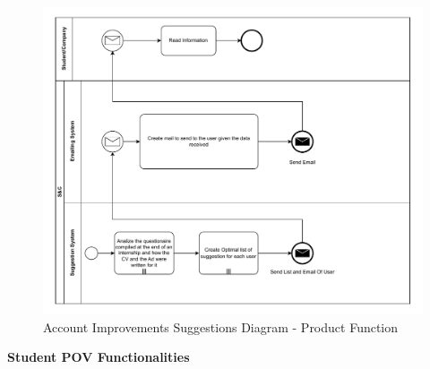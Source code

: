 \begin{itemize}
            \begin{figure}[H]
                  \centering
                  \includegraphics[width=1.0\textwidth]{Images/BPMN_2.pdf}
                  \caption{Account Improvements Suggestions Diagram - Product Function}
                  \label{fig:account_improvements_suggestions_diagram}
            \end{figure}
\end{itemize}

\par\textbf{Student POV Functionalities}

